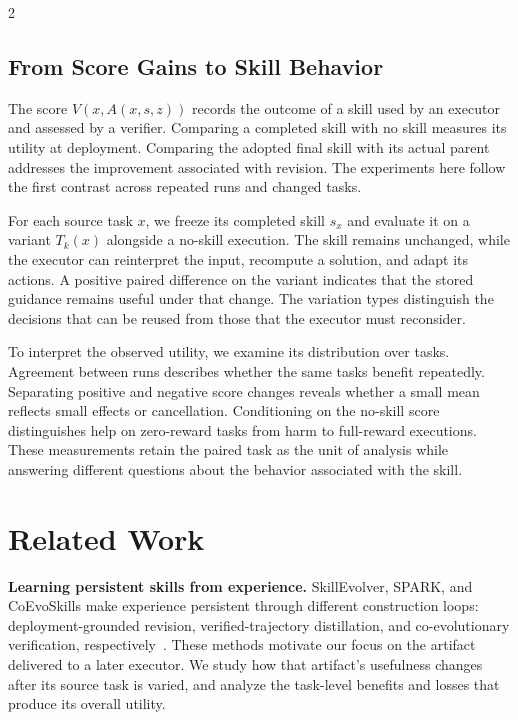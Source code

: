 \documentclass[10pt,letterpaper]{article}
\begin{document}
\begin{multicols}{2}

\subsection{From Score Gains to Skill Behavior}

The score $V(x,A(x,s,z))$ records the outcome of a skill used by an executor and assessed by a verifier. Comparing a completed skill with no skill measures its utility at deployment. Comparing the adopted final skill with its actual parent addresses the improvement associated with revision. The experiments here follow the first contrast across repeated runs and changed tasks.

For each source task $x$, we freeze its completed skill $s_x$ and evaluate it on a variant $T_k(x)$ alongside a no-skill execution. The skill remains unchanged, while the executor can reinterpret the input, recompute a solution, and adapt its actions. A positive paired difference on the variant indicates that the stored guidance remains useful under that change. The variation types distinguish the decisions that can be reused from those that the executor must reconsider.

To interpret the observed utility, we examine its distribution over tasks. Agreement between runs describes whether the same tasks benefit repeatedly. Separating positive and negative score changes reveals whether a small mean reflects small effects or cancellation. Conditioning on the no-skill score distinguishes help on zero-reward tasks from harm to full-reward executions. These measurements retain the paired task as the unit of analysis while answering different questions about the behavior associated with the skill.





\section{Related Work}

\noindent\textbf{Learning persistent skills from experience.}
SkillEvolver, SPARK, and CoEvoSkills make experience persistent through different construction loops: deployment-grounded revision, verified-trajectory distillation, and co-evolutionary verification, respectively~\cite{zhang2026skillevolver,zhou2026spark,zhang2026coevoskills}. These methods motivate our focus on the artifact delivered to a later executor. We study how that artifact's usefulness changes after its source task is varied, and analyze the task-level benefits and losses that produce its overall utility.


\end{multicols}
\end{document}
